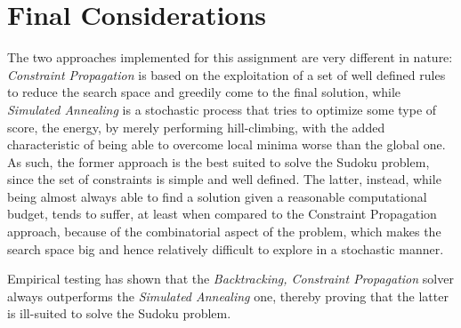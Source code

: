 \chapter*{Final Considerations}

The two approaches implemented for this assignment are very different in nature: \textit{Constraint Propagation} is based on the exploitation of a set of well defined rules to reduce the search space and greedily come to the final solution, while \textit{Simulated Annealing} is a stochastic process that tries to optimize some type of score, the energy, by merely performing hill-climbing, with the added characteristic of being able to overcome local minima worse than the global one. As such, the former approach is the best suited to solve the Sudoku problem, since the set of constraints is simple and well defined. The latter, instead, while being almost always able to find a solution given a reasonable computational budget, tends to suffer, at least when compared to the Constraint Propagation approach, because of the combinatorial aspect of the problem, which makes the search space big and hence relatively difficult to explore in a stochastic manner.
\par
Empirical testing has shown that the \textit{Backtracking, Constraint Propagation} solver always outperforms the \textit{Simulated Annealing} one, thereby proving that the latter is ill-suited to solve the Sudoku problem.